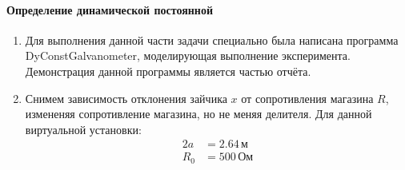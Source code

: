 \documentclass[12pt]{article}
\begin{document}
\paragraph{Определение динамической постоянной}
\begin{enumerate}
	\item
		Для выполнения данной части задачи специально была написана программа DyConstGalvanometer, моделирующая выполнение эксперимента. Демонстрация данной программы является частью отчёта.
	\item
		Снимем зависимость отклонения зайчика $x$ от сопротивления магазина $R$, измененяя сопротивление магазина, но не меняя делителя. Для данной виртуальной установки:
		\begin{align*}
			2a &= 2.64 \, \text{м} \\
			R_0 &= 500 \, \text{Ом}
		\end{align*}
		

\end{enumerate}
\end{document}

